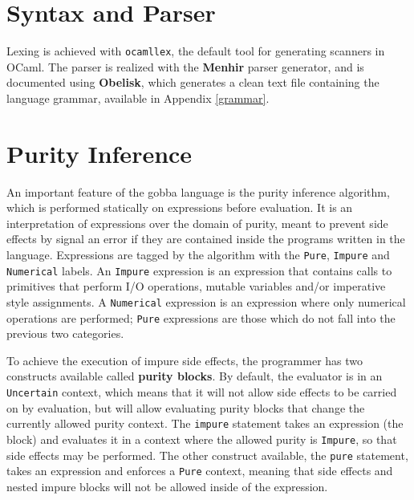 \documentclass[a4paper, 10pt]{article}
\theoremstyle{plain}%
\theoremstyle{definition}
\theoremstyle{remark}
\begin{document}
\begin{multicols}{2}

\section{Syntax and Parser}
Lexing is achieved with \texttt{ocamllex}, the default tool for generating
scanners in OCaml.
The parser is realized with the \textbf{Menhir} parser generator, and is
documented using \textbf{Obelisk}, which generates a clean text file
containing the language grammar, available in Appendix \ref{grammar}.

\section{Purity Inference}
An important feature of the gobba language is the purity inference algorithm,
which is performed statically on expressions before evaluation. It is an interpretation of expressions over the domain of purity, meant to
prevent side effects by signal an error if they are contained inside the
programs written in the language. Expressions are tagged by the algorithm with
the \texttt{Pure}, \texttt{Impure} and \texttt{Numerical} labels. An
\texttt{Impure} expression is an expression that contains calls to primitives
that perform I/O operations, mutable variables and/or imperative style
assignments. A \texttt{Numerical} expression is an expression where only
numerical operations are performed; \texttt{Pure} expressions are those which do not fall into the previous two
categories.

To achieve the execution of impure side effects, the programmer has two constructs
available called \textbf{purity blocks}. By default, the evaluator is in an
\texttt{Uncertain} context, which means that it will not allow side effects to
be carried on by evaluation, but will allow evaluating purity blocks that change
the currently allowed purity context. The \texttt{impure} statement takes an
expression (the block) and evaluates it in a context where the allowed purity is
\texttt{Impure}, so that side effects may be performed. The other construct
available, the \texttt{pure} statement, takes an expression and enforces a
\texttt{Pure} context, meaning that side effects and nested impure blocks will
not be allowed inside of the expression.


\end{multicols}
\end{document}
